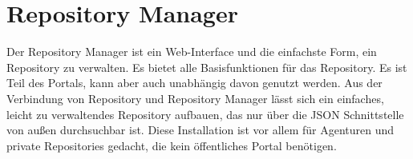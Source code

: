 \chapter{Repository Manager}
Der Repository Manager ist ein Web-Interface und die einfachste Form, ein Repository zu verwalten. Es bietet alle Basisfunktionen für das Repository. Es ist Teil des Portals, kann aber auch unabhängig davon genutzt werden.
Aus der Verbindung von Repository und Repository Manager lässt sich ein einfaches, leicht zu verwaltendes Repository aufbauen, das nur über die JSON Schnittstelle von außen durchsuchbar ist.
Diese Installation ist vor allem für Agenturen und private Repositories gedacht, die kein öffentliches Portal benötigen.

